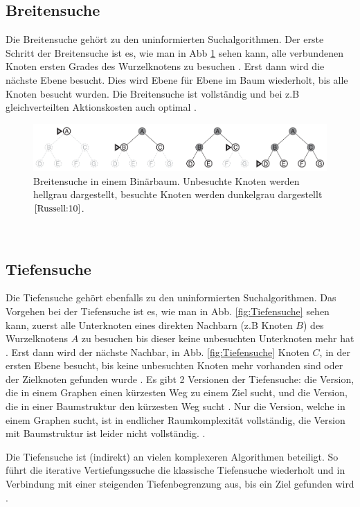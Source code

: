 \subsection{Breitensuche}
\label{Breitensuche}
Die Breitensuche gehört zu den uninformierten Suchalgorithmen. 
Der erste Schritt der Breitensuche ist es, wie man in Abb \ref{fig:Breitensuche} sehen kann, alle verbundenen Knoten ersten Grades des Wurzelknotens zu besuchen \cite[80-82]{Russell:10}.
Erst dann wird die nächste Ebene besucht. Dies wird Ebene für Ebene im Baum wiederholt, bis alle Knoten besucht wurden. 
Die Breitensuche ist vollständig und bei z.B gleichverteilten Aktionskosten auch optimal \cite[80-82]{Russell:10}.
\begin{figure}
	\centering
	\includegraphics[width=1.0\textwidth]{images/breitensuche.png}
	\caption{Breitensuche in einem Binärbaum. Unbesuchte Knoten werden hellgrau dargestellt, besuchte Knoten werden dunkelgrau dargestellt $\cite[80-82]{Russell:10}$.}
	\label{fig:Breitensuche}
\end{figure}
\\
\newpage
\subsection{Tiefensuche}
\label{Tiefensuche}
Die Tiefensuche gehört ebenfalls zu den uninformierten Suchalgorithmen.
Das Vorgehen bei der Tiefensuche ist es, wie man in Abb. \ref{fig:Tiefensuche} sehen kann, zuerst alle Unterknoten eines direkten Nachbarn (z.B Knoten $B$) des Wurzelknotens $A$ zu besuchen bis dieser 
keine unbesuchten Unterknoten mehr hat \cite[85,86]{Russell:10}.
Erst dann wird der nächste Nachbar, in Abb. \ref{fig:Tiefensuche} Knoten $C$, in der ersten Ebene besucht, bis keine unbesuchten Knoten mehr vorhanden sind oder der Zielknoten gefunden wurde \cite[85,86]{Russell:10}.
Es gibt 2 Versionen der Tiefensuche: die Version, die in einem Graphen einen kürzesten Weg zu einem Ziel sucht, und die Version, 
die in einer Baumstruktur den kürzesten Weg sucht \cite[85,86]{Russell:10}.
Nur die Version, welche in einem Graphen sucht, ist in endlicher Raumkomplexität vollständig, die Version mit Baumstruktur ist leider nicht vollständig. \cite[85,86]{Russell:10}.

Die Tiefensuche ist (indirekt) an vielen komplexeren Algorithmen beteiligt. 
So führt die iterative Vertiefungssuche die klassische Tiefensuche wiederholt und in Verbindung mit einer steigenden 
Tiefenbegrenzung aus, bis ein Ziel gefunden wird \cite[108,109]{Russell:10}.

